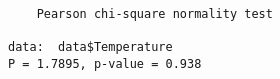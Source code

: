 \begin{verbatim} 

	Pearson chi-square normality test

data:  data$Temperature
P = 1.7895, p-value = 0.938

\end{verbatim}
